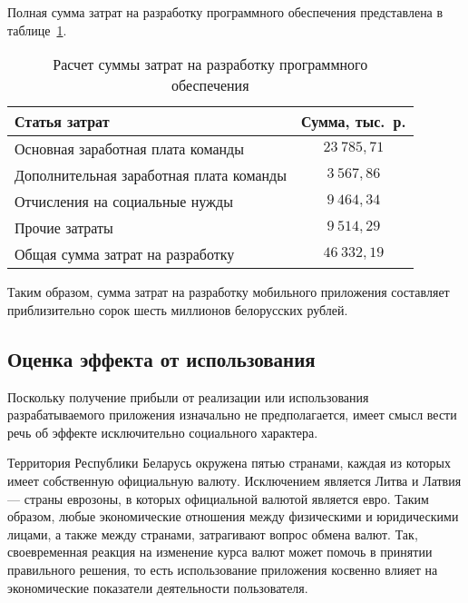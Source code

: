 Полная сумма затрат на разработку программного обеспечения представлена
в таблице~\ref{tbl:teo_sum_cost}.

\begin{table} [h!]
  \caption{
    Расчет суммы затрат на разработку программного \\
    \hspace{29.5mm} обеспечения
  }\label{tbl:teo_sum_cost}
  \begin{tabular}{| m{13.5cm} | c |}
    \hline

    \parbox{13.5cm}{
    \smallskip
    \centering Статья затрат
    \smallskip
    }
    &
      \parbox{2cm}{
      \smallskip
      \centering Сумма, тыс.~р.
    \smallskip
    } \\
    \hline

    Основная заработная плата команды
    & \( 23 \: 785{,}71 \)\\
    \hline

    Дополнительная заработная плата команды
    & \( 3 \: 567{,}86 \)\\
    \hline

    Отчисления на социальные нужды
    & \( 9 \: 464{,}34 \)\\
    \hline

    Прочие затраты
    & \( 9 \: 514{,}29 \)\\
    \hline

    Общая сумма затрат на разработку
    & \( 46 \: 332{,}19 \) \\
    \hline
  \end{tabular}
\end{table}

Таким образом, сумма затрат на разработку мобильного приложения
составляет приблизительно сорок шесть миллионов белорусских рублей.

\subsection{Оценка эффекта от использования}

Поскольку получение прибыли от реализации или использования
разрабатываемого приложения изначально не предполагается,
имеет смысл вести речь об эффекте исключительно социального характера.

Территория Республики Беларусь окружена пятью странами, каждая из которых
имеет собственную официальную валюту. Исключением является Литва и Латвия ---
страны еврозоны, в которых официальной валютой является евро. Таким
образом, любые экономические отношения между физическими и юридическими лицами,
а также между странами, затрагивают вопрос обмена валют.
Так, своевременная реакция на изменение курса валют может помочь
в принятии правильного решения, то есть использование приложения
косвенно влияет на экономические показатели деятельности пользователя.
